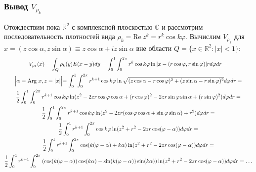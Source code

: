 \documentclass[a4paper]{article}
\newcommand{\R}[1]{\mathbb{R}^#1}
\begin{document}
\subsubsection{Вывод $V_{\rho_k}$}
Отождествим пока $\R{2}$ с комплексной плоскостью $\mathbb{C}$ и рассмотрим последовательность плотностей вида $\rho_k=\text{Re}\ z^k=r^k \cos k\varphi$.
Вычислим $V_{\rho_k}$ для $x=(z \cos\alpha,z \sin \alpha) \equiv z \cos\alpha + i z \sin \alpha$ вне области $Q= \{x \in \R{2}: |x|<1 \}$:
\begin{multline}
    V_{\rho_k}(x)= \int_Q \rho_k(y) E(x-y) dy= \int_0^1 \int_0^{2 \pi} r^k \cos k\varphi \ln |x-(r \cos \varphi, r \sin\varphi)| r d\varphi dr =\\
\Bigl|\alpha = \text{Arg}\ x, z=|x| \Bigl|=
\int_0^1 \int_0^{2 \pi} r^{k+1} \cos k\varphi \ln \sqrt{(z\cos \alpha-r \cos \varphi)^2+(z\sin \alpha-r \sin\varphi)^2} d\varphi dr=\\
\frac{1}{2} \int_0^1 \int_0^{2 \pi} r^{k+1} \cos k\varphi \ln(z^2 - 2z r \cos\varphi \cos \alpha +(r \cos \varphi)^2 - 2z r \sin \varphi \sin \alpha +(r \sin \varphi)^2) d\varphi dr =\\
\frac{1}{2} \int_0^1 \int_0^{2 \pi} r^{k+1} \cos k\varphi \ln(z^2-2zr(\cos \varphi \cos \alpha + \sin \varphi \sin \alpha)+r^{2})d\varphi dr=\\
\frac{1}{2} \int_0^1 r^{k+1}\int_0^{2 \pi}  \cos k\varphi \ln(z^2 + r^{2} - 2zr \cos (\varphi -\alpha)) d\varphi dr=\\
\frac{1}{2} \int_0^1 r^{k+1}\int_0^{2 \pi}\cos (k(\varphi -\alpha)+k\alpha)\ln(z^2 + r^{2} - 2zr \cos (\varphi -\alpha)) d\varphi dr= \\
\frac{1}{2} \int_0^1 r^{k+1}\int_0^{2 \pi}\left(\cos (k(\varphi -\alpha)) \cos(k\alpha) - \sin (k(\varphi -\alpha)) \sin(k\alpha)\right) \ln(z^2 + r^{2} - 2zr \cos (\varphi -\alpha)) d\varphi dr=\dots
\end{multline}
\end{document}
